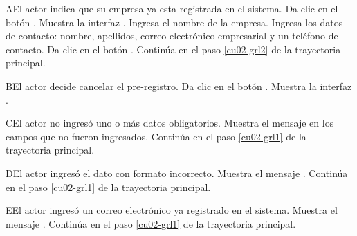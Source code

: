 \begin{UCtrayectoriaA}{A}{El actor indica que su empresa ya esta registrada en el sistema.}
	\UCpaso [\UCactor] Da clic en el botón .
	\UCpaso [\UCsist] Muestra la interfaz .
	\UCpaso [\UCactor] Ingresa el nombre de la empresa.
	\UCpaso [\UCactor] Ingresa los datos de contacto: nombre, apellidos, correo electrónico empresarial y un teléfono de contacto.
	\UCpaso [\UCactor] Da clic en el botón . 
	\UCpaso [\UCsist] Continúa en el paso \ref{cu02-grl2} de la trayectoria principal.
\end{UCtrayectoriaA} 

\begin{UCtrayectoriaA}{B}{El actor decide cancelar el pre-registro.}
	\UCpaso [\UCactor] Da clic en el botón .
	\UCpaso [\UCsist] Muestra la interfaz .
\end{UCtrayectoriaA} 

\begin{UCtrayectoriaA}{C}{El actor no ingresó uno o más datos obligatorios.}
	\UCpaso [\UCsist] Muestra el mensaje  en los campos que no
	fueron ingresados.
	\UCpaso [\UCsist] Continúa en el paso \ref{cu02-grl1} de la trayectoria principal.
\end{UCtrayectoriaA} 

\begin{UCtrayectoriaA}{D}{El actor ingresó el dato con formato incorrecto.}
	\UCpaso [\UCsist] Muestra el mensaje .
	\UCpaso [\UCsist] Continúa en el paso \ref{cu02-grl1} de la trayectoria principal.
\end{UCtrayectoriaA} 

\begin{UCtrayectoriaA}{E}{El actor ingresó un correo electrónico ya registrado en el sistema.}
	\UCpaso [\UCsist] Muestra el mensaje .
	\UCpaso [\UCsist] Continúa en el paso \ref{cu02-grl1} de la trayectoria principal.
\end{UCtrayectoriaA} 